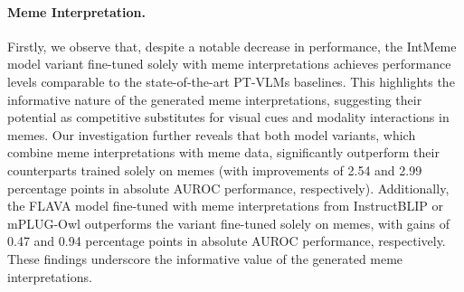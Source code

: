\paragraph{Meme Interpretation.} 

Firstly, we observe that, despite a notable decrease in performance, the \textsf{IntMeme} model variant fine-tuned solely with meme interpretations achieves performance levels comparable to the state-of-the-art PT-VLMs baselines. This highlights the informative nature of the generated meme interpretations, suggesting their potential as competitive substitutes for visual cues and modality interactions in memes. Our investigation further reveals that both model variants, which combine meme interpretations with meme data, significantly outperform their counterparts trained solely on memes (with improvements of 2.54 and 2.99 percentage points in absolute AUROC performance, respectively). Additionally, the FLAVA model fine-tuned with meme interpretations from InstructBLIP or mPLUG-Owl outperforms the variant fine-tuned solely on memes, with gains of 0.47 and 0.94 percentage points in absolute AUROC performance, respectively. These findings underscore the informative value of the generated meme interpretations.

